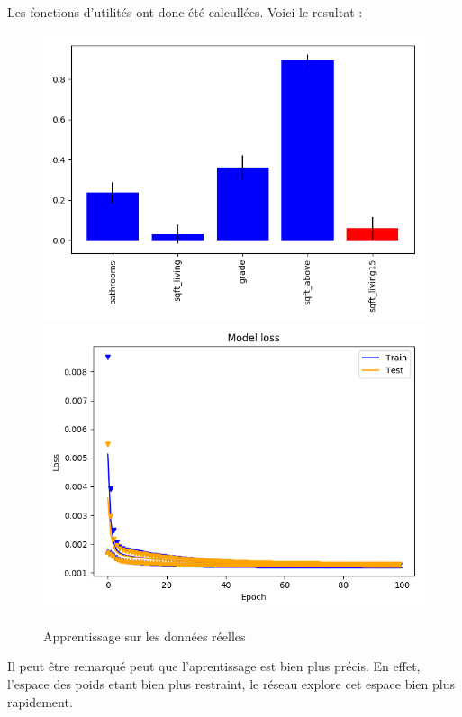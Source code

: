 Les fonctions d'utilités ont donc été calcullées.
Voici le resultat :
\begin{figure}[H]
    \center
    \includegraphics[height=\petit]{pict/real/resut.png}
    \includegraphics[height=\petit]{pict/real/learnut.png}
	\caption{Apprentissage sur les données réelles}
	\label{fig:ut1_100_100}
\end{figure}
Il peut être remarqué peut que l'aprentissage est bien plus précis.
En effet, l'espace des poids etant bien plus restraint,
le réseau explore cet espace bien plus rapidement.


